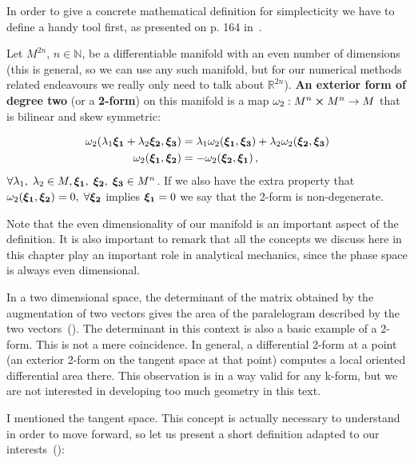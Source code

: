 \documentclass[12pt, class=report, crop=false]{standalone}
\begin{document}
In order to give a concrete mathematical definition for simplecticity we have to define a handy tool first, as presented on p. 164 in~\cite{arnoldMathematicalMethodsClassical1997}.

\begin{definition}
  Let \(M^{2n}\), \(n\in \mathbb{N}\), be a differentiable manifold with an even number of dimensions (this is general, so we can use any such manifold, but for our numerical methods related endeavours we really only need to talk about \(\mathbb{R}^{2n}\)). \textbf{An exterior form of degree two} (or a \textbf{2-form}) on this manifold is a map \(\omega_2 : M^n \cp M^n \rightarrow M\) that is bilinear and skew symmetric:

  \begin{align*}
  \omega_2 (\lambda_1 \vb*{\xi_1} + \lambda_2 \vb*{\xi_2}, \vb*{\xi_3}) &=
  \lambda_1 \omega_2 (\vb*{\xi_1}, \vb*{\xi_3}) + \lambda_2 \omega_2 (\vb*{\xi_2}, \vb*{\xi_3}) \\
  \omega_2 (\vb*{\xi_1},\vb*{\xi_2}) &= -\omega_2 (\vb*{\xi_2}, \vb*{\xi_1})\,,
  \end{align*}
  \(\forall \lambda_1,\;\lambda_2 \in M, \vb*{\xi_1},\;\vb*{\xi_2},\;\vb*{\xi_3} \in M^n\).
  If we also have the extra property that \(\omega_2 (\vb*{\xi_1},\vb*{\xi_2}) = 0,\;\forall \vb*{\xi_2}\) implies \(\vb*{\xi_1}=0\) we say that the 2-form is non-degenerate.
\end{definition}

Note that the even dimensionality of our manifold is an important aspect of the definition. It is also important to remark that all the concepts we discuss here in this chapter play an important role in analytical mechanics, since the phase space is always even dimensional.

In a two dimensional space, the determinant of the matrix obtained by the augmentation of two vectors gives the area of the paralelogram described by the two vectors~(\cite{golombProofWordsDeterminant1985}). The determinant in this context is also a basic example of a 2-form. This is not a mere coincidence. In general, a differential 2-form at a point (an exterior 2-form on the tangent space at that point) computes a local oriented differential area there. This observation is in a way valid for any k-form, but we are not interested in developing too much geometry in this text.

I mentioned the tangent space. This concept is actually necessary to understand in order to move forward, so let us present a short definition adapted to our interests~(\cite{weissteinTangentSpace}):
\end{document}

